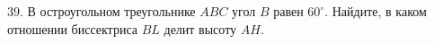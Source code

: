 39. В остроугольном треугольнике $ABC$ угол $B$ равен $60^\circ.$ Найдите, в каком отношении биссектриса $BL$ делит высоту $AH.$\\
